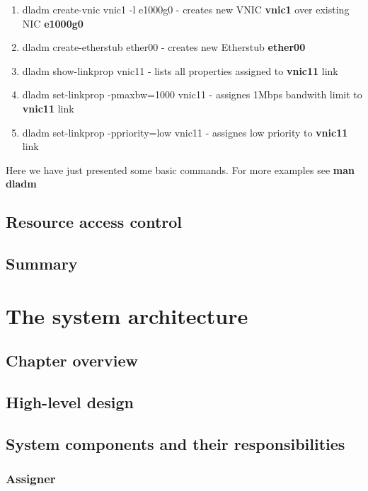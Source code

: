 \documentclass[11pt]{book}
\begin{document}
        \begin{enumerate}
        	\item{dladm create-vnic vnic1 -l e1000g0 - creates new VNIC \textbf{vnic1} over existing NIC \textbf{e1000g0}}
        	\item{dladm create-etherstub ether00 - creates new Etherstub \textbf{ether00}}
        	\item{dladm show-linkprop vnic11 - lists all properties assigned to \textbf{vnic11} link}
        	\item{dladm set-linkprop -pmaxbw=1000 vnic11 - assignes 1Mbps bandwith limit to \textbf{vnic11} link}
        	\item{dladm set-linkprop -ppriority=low vnic11 - assignes low priority to \textbf{vnic11} link}
        \end{enumerate}

        Here we have just presented some basic commands. For more examples see \textbf{man dladm}
        

    \section{Resource access control}

    \section*{Summary}


  \chapter{The system architecture}

    \section*{Chapter overview}



    \section{High-level design}


    \section{System components and their responsibilities}

      \subsection{Assigner}
\end{document}
